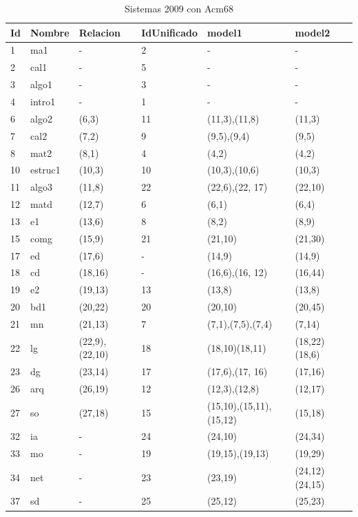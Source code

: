 \begin{table}[H]
\centering
\caption{Sistemas 2009 con Acm68}
\begin{tabular}[t]{|llllll|}
\hline
Id & Nombre & Relacion &  IdUnificado & model1 & model2 \\
\hline
1 & ma1 & - & 2 & - & - \\
2 & cal1 & -  & 5 & - & - \\
3 & algo1 & - & 3 & - & - \\
4 & intro1 &- & 1 & - & - \\
6 & algo2 & (6,3)  & 11 & (11,3),(11,8) & (11,3) \\
7 & cal2 & (7,2) & 9 & (9,5),(9,4) & (9,5) \\
8 & mat2 & (8,1) & 4 & (4,2) & (4,2) \\
10 & estruc1 & (10,3)  & 10 & (10,3),(10,6) & (10,3) \\
11 & algo3 & (11,8) &  22 & (22,6),(22, 17) & (22,10) \\
12 & matd & (12,7)  & 6 & (6,1) & (6,4) \\
13 & e1 & (13,6) & 8 &	(8,2) & (8,9) \\
15 & comg & (15,9) & 21 & (21,10) & (21,30) \\
17 & ed & (17,6) &	- &(14,9) & (14,9) \\
18 & cd & (18,16) & - &	(16,6),(16, 12) & (16,44) \\
19 & e2 & (19,13) & 13 &(13,8) & (13,8) \\
20 & bd1 & (20,22) & 20 & (20,10) & (20,45) \\
21 & mn & (21,13) & 7 & (7,1),(7,5),(7,4) & (7,14) \\
22 & lg & (22,9),(22,10)  & 18 & (18,10)(18,11) & (18,22)(18,6) \\
23 & dg & (23,14) & 17 &(17,6),(17, 16)&(17,16) \\
26 & arq & (26,19) & 12 & (12,3),(12,8) & (12,17) \\
27 & so & (27,18)  & 15 & (15,10),(15,11),(15,12) & (15,18)	\\
32 & ia & -  & 24 & (24,10) & (24,34) \\
33 & mo & -  & 19 & (19,15),(19,13) & (19,29) \\
34 & net & -  & 23 & (23,19) & (24,12)(24,15) \\
37 & sd & - & 25 & (25,12) & (25,23) \\
\hline
\end{tabular}
\label{tab:tabsis2009}
\end{table}

